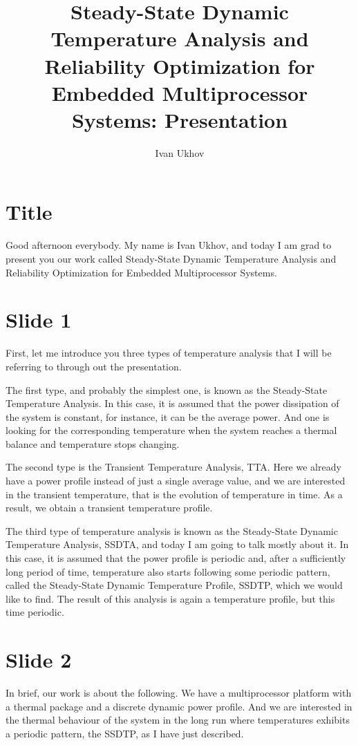 \documentclass[11pt,a4paper]{article}
\title{Steady-State Dynamic Temperature Analysis and Reliability Optimization for Embedded Multiprocessor Systems: Presentation}
\author{Ivan Ukhov}
\begin{document}
\maketitle

\section{Title}
Good afternoon everybody. My name is Ivan Ukhov, and today I am grad to present you our work called Steady-State Dynamic Temperature Analysis and Reliability Optimization for Embedded Multiprocessor Systems.

\section{Slide 1}
First, let me introduce you three types of temperature analysis that I will be referring to through out the presentation.

The first type, and probably the simplest one, is known as the Steady-State Temperature Analysis. In this case, it is assumed that the power dissipation of the system is constant, for instance, it can be the average power. And one is looking for the corresponding temperature when the system reaches a thermal balance and temperature stops changing.

The second type is the Transient Temperature Analysis, TTA. Here we already have a power profile instead of just a single average value, and we are interested in the transient temperature, that is the evolution of temperature in time. As a result, we obtain a transient temperature profile.

The third type of temperature analysis is known as the Steady-State Dynamic Temperature Analysis, SSDTA, and today I am going to talk mostly about it. In this case, it is assumed that the power profile is periodic and, after a sufficiently long period of time, temperature also starts following some periodic pattern, called the Steady-State Dynamic Temperature Profile, SSDTP, which we would like to find. The result of this analysis is again a temperature profile, but this time periodic.

\section{Slide 2}
In brief, our work is about the following. We have a multiprocessor platform with a thermal package and a discrete dynamic power profile. And we are interested in the thermal behaviour of the system in the long run where temperatures exhibits a periodic pattern, the SSDTP, as I have just described.
\end{document}
